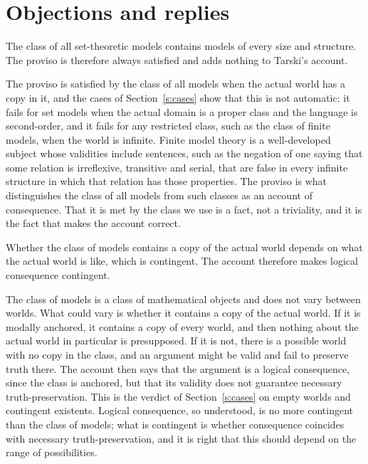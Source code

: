 \documentclass{situationist-preprint}
\begin{document}
\section{Objections and replies}\label{s:obj}

\begin{objection}[Triviality]
The class of all set-theoretic models contains models of every size and structure. The proviso is therefore always satisfied and adds nothing to Tarski's account.
\end{objection}

\begin{reply}
The proviso is satisfied by the class of all models when the actual world has a copy in it, and the cases of Section~\ref{s:cases} show that this is not automatic: it fails for set models when the actual domain is a proper class and the language is second-order, and it fails for any restricted class, such as the class of finite models, when the world is infinite. Finite model theory is a well-developed subject whose validities include sentences, such as the negation of one saying that some relation is irreflexive, transitive and serial, that are false in every infinite structure in which that relation has those properties. The proviso is what distinguishes the class of all models from such classes as an account of consequence. That it is met by the class we use is a fact, not a triviality, and it is the fact that makes the account correct.
\end{reply}

\begin{objection}[Contingency]
Whether the class of models contains a copy of the actual world depends on what the actual world is like, which is contingent. The account therefore makes logical consequence contingent.
\end{objection}

\begin{reply}
The class of models is a class of mathematical objects and does not vary between worlds. What could vary is whether it contains a copy of the actual world. If it is modally anchored, it contains a copy of every world, and then nothing about the actual world in particular is presupposed. If it is not, there is a possible world with no copy in the class, and an argument might be valid and fail to preserve truth there. The account then says that the argument is a logical consequence, since the class is anchored, but that its validity does not guarantee necessary truth-preservation. This is the verdict of Section~\ref{s:cases} on empty worlds and contingent existents. Logical consequence, so understood, is no more contingent than the class of models; what is contingent is whether consequence coincides with necessary truth-preservation, and it is right that this should depend on the range of possibilities.
\end{reply}
\end{document}
